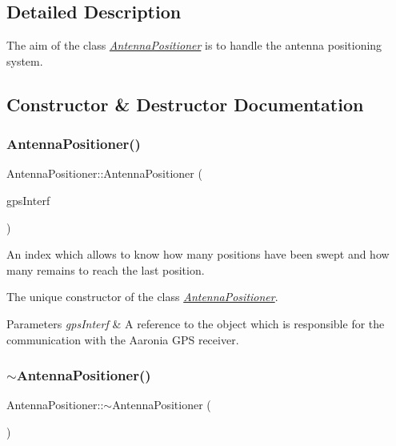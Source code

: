 \subsection{Detailed Description}
The aim of the class {\itshape \hyperlink{classAntennaPositioner}{Antenna\+Positioner}} is to handle the antenna positioning system. 

\subsection{Constructor \& Destructor Documentation}
\mbox{\label{classAntennaPositioner_ad7e864f6073421c98585c64802a3e78e}} 
\subsubsection{\texorpdfstring{Antenna\+Positioner()}{AntennaPositioner()}}
{\footnotesize\ttfamily Antenna\+Positioner\+::\+Antenna\+Positioner (\begin{DoxyParamCaption}\item[{\hyperlink{classGPSInterface}{G\+P\+S\+Interface} \&}]{gps\+Interf }\end{DoxyParamCaption})}



An index which allows to know how many positions have been swept and how many remains to reach the last position. 

The unique constructor of the class {\itshape \hyperlink{classAntennaPositioner}{Antenna\+Positioner}}.


\begin{DoxyParams}{Parameters}
{\em gps\+Interf} & A reference to the object which is responsible for the communication with the Aaronia G\+PS receiver. \\
\hline
\end{DoxyParams}
\mbox{\label{classAntennaPositioner_a7a3a48b1aab43b9a43b664567a8c5829}} 
\subsubsection{\texorpdfstring{$\sim$\+Antenna\+Positioner()}{~AntennaPositioner()}}
{\footnotesize\ttfamily Antenna\+Positioner\+::$\sim$\+Antenna\+Positioner (\begin{DoxyParamCaption}{ }\end{DoxyParamCaption})\hspace{0.3cm}{\ttfamily [inline]}}



